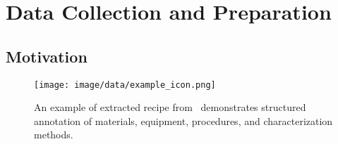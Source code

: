 


\section{Data Collection and Preparation}
\label{sec:data_collection }

\subsection{Motivation}
\label{subsec:motivation}

\begin{figure*}[t]
\centering
\texttt{[image: image/data/example\_icon.png]}
\caption{An example of extracted recipe from~\citeauthor{zhao2020synthesis} demonstrates structured annotation of materials, equipment, procedures, and characterization methods.}
\label{fig:data-example}
\end{figure*}

